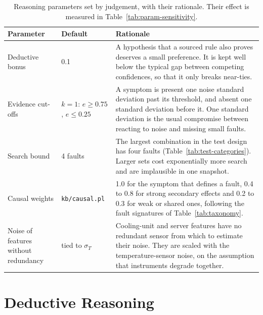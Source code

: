 \begin{table}[htbp]
  \centering
  \small
  \caption{Reasoning parameters set by judgement, with their rationale. Their effect is measured in Table~\ref{tab:param-sensitivity}.}
  \label{tab:design-params}
  \begin{tabular}{L{3.0cm}L{2.4cm}L{8.7cm}}
  \toprule
  Parameter & Default & Rationale \\
  \midrule
  Deductive bonus & 0.1 & A hypothesis that a sourced rule also proves deserves a small preference. It is kept well below the typical gap between competing confidences, so that it only breaks near-ties. \\
  Evidence cut-offs & $k = 1$: $e \ge 0.75$, $e \le 0.25$ & A symptom is present one noise standard deviation past its threshold, and absent one standard deviation before it. One standard deviation is the usual compromise between reacting to noise and missing small faults. \\
  Search bound & 4 faults & The largest combination in the test design has four faults (Table~\ref{tab:test-categories}). Larger sets cost exponentially more search and are implausible in one snapshot. \\
  Causal weights & \texttt{kb/causal.pl} & 1.0 for the symptom that defines a fault, 0.4 to 0.8 for strong secondary effects and 0.2 to 0.3 for weak or shared ones, following the fault signatures of Table~\ref{tab:taxonomy}. \\
  Noise of features without redundancy & tied to $\sigma_T$ & Cooling-unit and server features have no redundant sensor from which to estimate their noise. They are scaled with the temperature-sensor noise, on the assumption that instruments degrade together. \\
  \bottomrule
  \end{tabular}
\end{table}

\section{Deductive Reasoning}
\label{sec:deductive}

